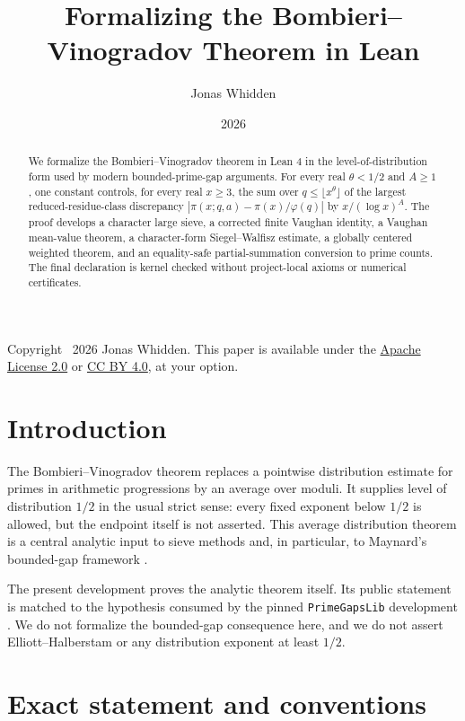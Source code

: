 \documentclass[11pt]{amsart}
\title[Formalizing Bombieri--Vinogradov in Lean]{Formalizing the Bombieri--Vinogradov Theorem in Lean}
\author{Jonas Whidden}
\date{2026}
\theoremstyle{definition}
\theoremstyle{remark}
\begin{document}
\begin{abstract}
We formalize the Bombieri--Vinogradov theorem in Lean 4 in the
level-of-distribution form used by modern bounded-prime-gap arguments.
For every real $\theta<1/2$ and $A\geq1$, one constant controls, for every
real $x\geq3$, the sum over $q\leq\lfloor x^\theta\rfloor$ of the largest
reduced-residue-class discrepancy
$|\pi(x;q,a)-\pi(x)/\varphi(q)|$ by $x/(\log x)^A$.
The proof develops a character large sieve, a corrected finite Vaughan
identity, a Vaughan mean-value theorem, a character-form Siegel--Walfisz
estimate, a globally centered weighted theorem, and an equality-safe
partial-summation conversion to prime counts. The final declaration is
kernel checked without project-local axioms or numerical certificates.
\end{abstract}

\maketitle

\begin{center}
\small
Copyright \textcopyright\ 2026 Jonas Whidden. This paper is available under
the \href{https://www.apache.org/licenses/LICENSE-2.0}{Apache License 2.0} or
\href{https://creativecommons.org/licenses/by/4.0/}{CC BY 4.0}, at your option.
\end{center}

\section{Introduction}

The Bombieri--Vinogradov theorem replaces a pointwise distribution estimate
for primes in arithmetic progressions by an average over moduli. It supplies
level of distribution $1/2$ in the usual strict sense: every fixed exponent
below $1/2$ is allowed, but the endpoint itself is not asserted. This average
distribution theorem is a central analytic input to sieve methods and, in
particular, to Maynard's bounded-gap framework \cite{Maynard2015}.

The present development proves the analytic theorem itself. Its public
statement is matched to the hypothesis consumed by the pinned
\texttt{PrimeGapsLib} development \cite{PrimeGapsLib}. We do not formalize
the bounded-gap consequence here, and we do not assert Elliott--Halberstam or
any distribution exponent at least $1/2$.

\section{Exact statement and conventions}
\end{document}
